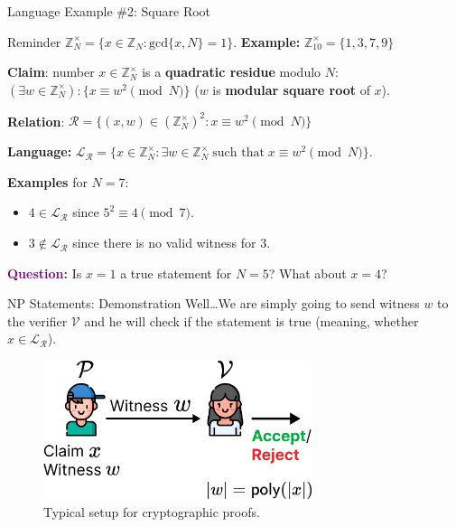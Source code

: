 \documentclass[xcolor={usenames,dvipsnames}]{beamer}
\begin{document}
    \begin{frame}{Language Example \#2: Square Root}
        \begin{block}{Reminder}
            $\mathbb{Z}_N^{\times} = \{x \in \mathbb{Z}_N: \text{gcd}\{x,N\}=1\}$. \textbf{Example:} $\mathbb{Z}_{10}^{\times} = \{1,3,7,9\}$
        \end{block}

        \begin{example}
            \textbf{Claim}: number $x \in \mathbb{Z}_N^{\times}$ is a \textbf{quadratic residue} modulo $N$: $(\exists w \in \mathbb{Z}_N^{\times}): \{x \equiv w^2 \pmod{N}\}$ ($w$ is \textbf{modular square root} of $x$). 
            
            \textbf{Relation}: $\mathcal{R} = \{ (x, w) \in (\mathbb{Z}_N^{\times})^2: x \equiv w^2 \pmod{N} \}$
        
            \textbf{Language:} $\mathcal{L}_{\mathcal{R}} = \{x \in \mathbb{Z}_N^{\times}: \exists w \in \mathbb{Z}_N^{\times} \; \text{such that} \; x \equiv w^2 \pmod{N}\}$. 
            
            \textbf{Examples} for $N=7$: 
            \begin{itemize}
                \item $4 \in \mathcal{L}_{\mathcal{R}}$ since $5^2 \equiv 4 \pmod{7}$. 
                \item $3 \not\in \mathcal{L}_{\mathcal{R}}$ since there is no valid witness for $3$.
            \end{itemize}
        \end{example}

        \textcolor{purple}{\textbf{Question:}} Is $x=1$ a true statement for $N=5$? What about $x=4$?
    \end{frame}

    \begin{frame}{NP Statements: Demonstration}
        Well\ldots We are simply going to send witness $w$ to the verifier $\mathcal{V}$ and he will check if the statement is true (meaning, whether $x \in \mathcal{L}_{\mathcal{R}}$).

        \begin{figure}
            \centering
            \includegraphics[width=0.7\textwidth]{images/lecture_6/np.pdf}
            \caption{Typical setup for cryptographic proofs.}
        \end{figure}
    \end{frame}
\end{document}
